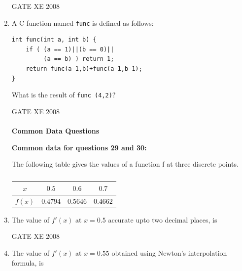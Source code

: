 \documentclass[12pt]{article}
\begin{document}
\begin{enumerate}
GATE XE 2008
\item A C function named \texttt{func} is defined as follows:
\begin{verbatim}
int func(int a, int b) {
    if ( (a == 1)||(b == 0)||
         (a == b) ) return 1;
    return func(a-1,b)+func(a-1,b-1);
}

\end{verbatim}
What is the result of \texttt{func (4,2)}?

\begin{enumerate}
\end{enumerate}

GATE XE 2008
\\
\\

\noindent \textbf{\large Common Data Questions}

\textbf{Common data for questions 29 and 30: }

The following table gives the values of a function f at three discrete points.

\begin{table}[H]     \centering     \caption{}     \label{}     \begin{tabular}{|c|c|c|c|}
    \hline
    $x$ & $0.5$ & $0.6$ & $0.7$ \\
    \hline
    $f(x)$ & $0.4794$ & $0.5646$ & $0.4662$ \\
    \hline
\end{tabular} \end{table}
\item The value of $f'(x)$ at $x = 0.5$ accurate upto two decimal places, is

\begin{enumerate}
\end{enumerate}

GATE XE 2008
\item  The value of $f'(x)$ at $x =0.55$ obtained using Newton's interpolation formula, is


\end{enumerate}
\end{document}
